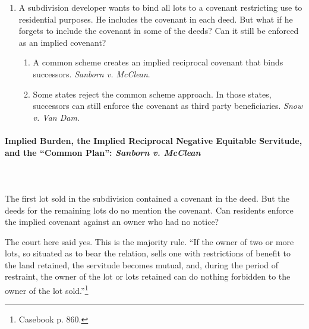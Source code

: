\begin{enumerate}
    \item A subdivision developer wants to bind all lots to a covenant 
    restricting use to residential purposes. He includes the covenant in each 
    deed. But what if he forgets to include the covenant in some of the deeds? 
    Can it still be enforced as an implied covenant?
    \begin{enumerate}
        \item A common scheme creates an implied reciprocal covenant that 
        binds successors. \emph{Sanborn v. McClean}.
        \item Some states reject the common scheme approach. In those states, 
        successors can still enforce the covenant as third party 
        beneficiaries. \emph{Snow v. Van Dam}.
    \end{enumerate}
\end{enumerate}

\paragraph{Implied Burden, the Implied Reciprocal Negative Equitable 
Servitude, and the ``Common Plan'': \emph{Sanborn v. McClean}}
~\\\\
The first lot sold in the subdivision contained a covenant in the deed. But 
the deeds for the remaining lots do no mention the covenant. Can residents 
enforce the implied covenant against an owner who had no notice?

The court here said yes. This is the majority rule. ``If the owner of two or 
more lots, so situated as to bear the relation, sells one with restrictions of 
benefit to the land retained, the servitude becomes mutual, and, during the 
period of restraint, the owner of the lot or lots retained can do nothing 
forbidden to the owner of the lot sold.''\footnote{Casebook p.  860.}

